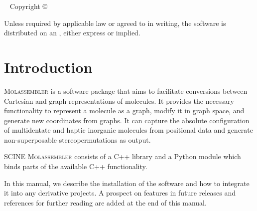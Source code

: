 \documentclass[]{tufte-book}
\title[SCINE Molassembler manual]{User Manual \vskip 0.5em
{\setlength{\parindent}{0pt} \Huge SCINE Molassembler 3.0.1}}
\author[The SCINE Molassembler Developers]{The SCINE Molassembler Developers:
\newline \noindent Moritz Bensberg, Stephanie A.~Grimmel, Jan-Grimo Sobez, Miguel Steiner, Jan P.~Unsleber, Thomas Weymuth, and Markus Reiher}
\newcommand{\monthyear}{%
  \ifcase\month\or January\or February\or March\or April\or May\or June\or
  July\or August\or September\or October\or November\or
  December\fi\space\number\year
}
\begin{document}
\setlength{\parindent}{0pt}

\frontmatter


\maketitle


\newpage
\begin{fullwidth}
~\vfill
\thispagestyle{empty}
\setlength{\parindent}{0pt}
\setlength{\parskip}{\baselineskip}
Copyright \copyright\ \the\year\ \thanklessauthor


\par{}

\par Unless required by applicable law or agreed to in writing, the software 
is distributed on an , either express or implied. 

\end{fullwidth}

\tableofcontents




\mainmatter

\let\cleardoublepage\clearpage
\chapter{Introduction}

\textsc{Molassembler} is a software package that aims to facilitate conversions
between Cartesian and graph representations of molecules. It provides the
necessary functionality to represent a molecule as a graph, modify it in graph
space, and generate new coordinates from graphs. It can capture the absolute
configuration of multidentate and haptic inorganic molecules from positional
data and generate non-superposable stereopermutations as output.

SCINE \textsc{Molassembler} consists of a C++ library and a Python module which
binds parts of the available C++ functionality. 

In this manual, we describe the installation of the software and how to
integrate it into any derivative projects. A prospect on
features in future releases and references for further reading are added at the
end of this manual.\enlargethispage{\baselineskip}
\end{document}
